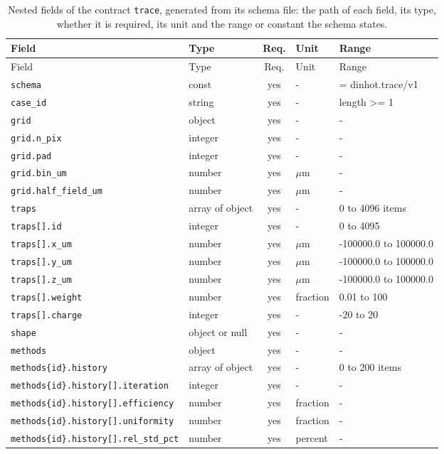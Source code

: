 \begingroup\scriptsize
\begin{longtable}{@{}l l c l l@{}}
\caption{Nested fields of the contract \texttt{trace}, generated from its schema file: the path of each field, its type, whether it is required, its unit and the range or constant the schema states.}\label{tab:fields-trace}\\
\toprule Field & Type & Req. & Unit & Range\\\midrule\endfirsthead
\toprule Field & Type & Req. & Unit & Range\\\midrule\endhead
\texttt{schema} & const & yes & - & = dinhot.trace/v1\\
\texttt{case\_id} & string & yes & - & length >= 1\\
\texttt{grid} & object & yes & - & -\\
\texttt{grid.n\_pix} & integer & yes & - & -\\
\texttt{grid.pad} & integer & yes & - & -\\
\texttt{grid.bin\_um} & number & yes & $\mu$m & -\\
\texttt{grid.half\_field\_um} & number & yes & $\mu$m & -\\
\texttt{traps} & array of object & yes & - & 0 to 4096 items\\
\texttt{traps[].id} & integer & yes & - & 0 to 4095\\
\texttt{traps[].x\_um} & number & yes & $\mu$m & -100000.0 to 100000.0\\
\texttt{traps[].y\_um} & number & yes & $\mu$m & -100000.0 to 100000.0\\
\texttt{traps[].z\_um} & number & yes & $\mu$m & -100000.0 to 100000.0\\
\texttt{traps[].weight} & number & yes & fraction & 0.01 to 100\\
\texttt{traps[].charge} & integer & yes & - & -20 to 20\\
\texttt{shape} & object or null & yes & - & -\\
\texttt{methods} & object & yes & - & -\\
\texttt{methods\{id\}.history} & array of object & yes & - & 0 to 200 items\\
\texttt{methods\{id\}.history[].iteration} & integer & yes & - & -\\
\texttt{methods\{id\}.history[].efficiency} & number & yes & fraction & -\\
\texttt{methods\{id\}.history[].uniformity} & number & yes & fraction & -\\
\texttt{methods\{id\}.history[].rel\_std\_pct} & number & yes & percent & -\\

\end{longtable}

